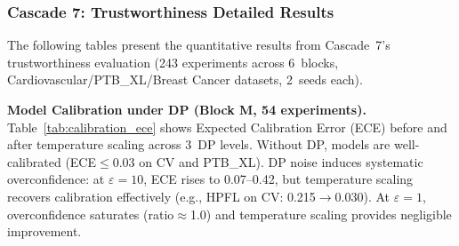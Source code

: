 \documentclass[conference]{IEEEtran}
\begin{document}
\clearpage

\subsubsection{Cascade 7: Trustworthiness Detailed Results}

The following tables present the quantitative results from Cascade~7's trustworthiness evaluation (243 experiments across 6~blocks, Cardiovascular/PTB\_XL/Breast Cancer datasets, 2~seeds each).

\smallskip\noindent\textbf{Model Calibration under DP (Block M, 54 experiments).}
Table~\ref{tab:calibration_ece} shows Expected Calibration Error (ECE) before and after temperature scaling across 3~DP levels. Without DP, models are well-calibrated (ECE$\leq$0.03 on CV and PTB\_XL). DP noise induces systematic overconfidence: at $\varepsilon{=}10$, ECE rises to 0.07--0.42, but temperature scaling recovers calibration effectively (e.g., HPFL on CV: 0.215$\to$0.030). At $\varepsilon{=}1$, overconfidence saturates (ratio$\approx$1.0) and temperature scaling provides negligible improvement.
\end{document}
